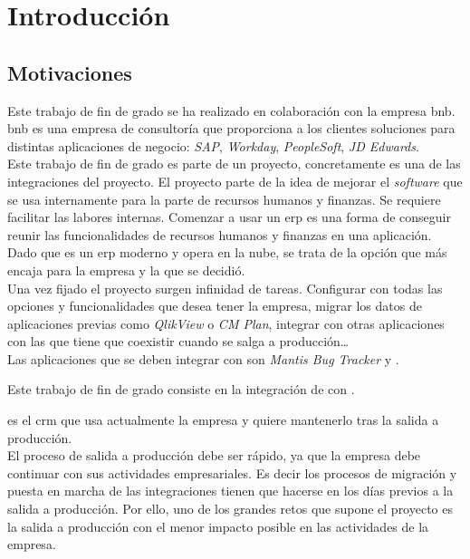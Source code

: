 \chapter{Introducción}


\section{Motivaciones}
Este trabajo de fin de grado se ha realizado en colaboración con la empresa \acrfull{bnb}.
\acrshort{bnb} es una empresa de consultoría que proporciona a los clientes soluciones para distintas aplicaciones de negocio: \textit{SAP}, \textit{Workday}, \textit{PeopleSoft}, \textit{JD Edwards}.\\

Este trabajo de fin de grado es parte de un proyecto, concretamente es una de las integraciones del proyecto.
El proyecto parte de la idea de mejorar el \textit{software} que se usa internamente para la parte de recursos humanos y finanzas. Se requiere facilitar las labores internas.
Comenzar a usar un \acrshort{erp} es una forma de conseguir reunir las funcionalidades de recursos humanos y finanzas en una aplicación.
Dado que \wday{} es un \acrshort{erp} moderno y opera en la nube, se trata de la opción que más encaja para la empresa y la que se decidió.
\\

Una vez fijado el proyecto surgen infinidad de tareas. Configurar \wday{} con todas las opciones y funcionalidades que desea tener la empresa, migrar los datos de aplicaciones previas como \textit{QlikView} o \textit{CM Plan}, 
integrar \wday{} con otras aplicaciones con las que tiene que coexistir cuando se salga a producción\ldots\\

Las aplicaciones que se deben integrar con \wday{} son \textit{Mantis Bug Tracker} y \hs{}.

Este trabajo de fin de grado consiste en la integración de \wday{} con \hs{}.

\hs{} es el \acrshort{crm} que usa actualmente la empresa y quiere mantenerlo tras la salida a producción.\\


El proceso de salida a producción debe ser rápido, ya que la empresa debe continuar con sus actividades empresariales. 
Es decir los procesos de migración y puesta en marcha de las integraciones tienen que hacerse en los días previos a la salida a producción.
Por ello, uno de los grandes retos que supone el proyecto es la salida a producción con el menor impacto posible en las actividades de la empresa.\\



